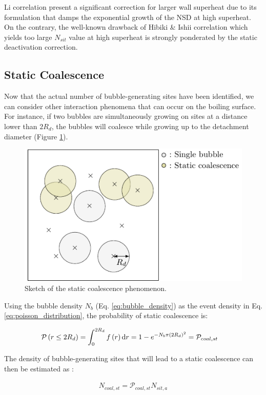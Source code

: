 \npar

Li \etal correlation present a significant correction for larger wall superheat due to its formulation that damps the exponential growth of the NSD at high superheat. On the contrary, the well-known drawback of Hibiki \& Ishii correlation which yields too large $N_{sit}$ value at high superheat is strongly ponderated by the static deactivation correction.


\subsection{Static Coalescence}

Now that the actual number of bubble-generating sites have been identified, we can consider other interaction phenomena that can occur on the boiling surface. For instance, if two bubbles are simultaneously growing on sites at a distance lower than $2R_{d}$, the bubbles will coalesce while growing up to the detachment diameter (Figure \ref{fig:static_coal}). 

\begin{figure}[!h]
\centering
\includegraphics[width=0.5\linewidth]{img/site_interaction/static_coal.pdf}
\caption{Sketch of the static coalescence phenomenon.}
\label{fig:static_coal}
\end{figure}



Using the bubble density $N_{b}$ (Eq. \ref{eq:bubble_density}) as the event density in Eq. \ref{eq:poisson_distribution}, the probability of static coalescence is:

\begin{align}
\mathcal{P}\left( r \leq 2R_{d} \right) &=\int_{0}^{2R_{d}}f\left( r \right) \mathrm{d}r = 1 - e^{-N_{b} \pi \left( 2R_{d} \right)^{2}}=\mathcal{P}_{coal,st}
\end{align}

The density of bubble-generating sites that will lead to a static coalescence can then be estimated as :

\begin{align}
N_{coal,st}=\mathcal{P}_{coal,st}N_{sit,a}
\end{align}

